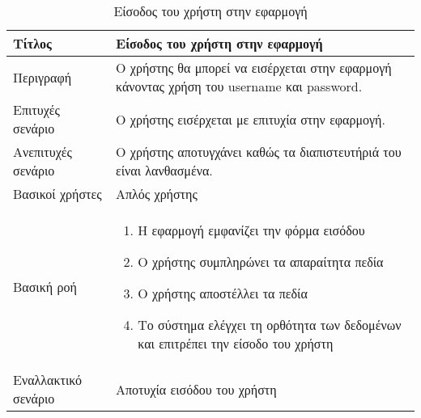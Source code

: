 
\begin{table}[h]
 \caption{Είσοδος του χρήστη στην εφαρμογή}
\begin{center}
\begin{tabular}{ | m{10em} |  m{25em} | } 
\hline
 Τίτλος & Είσοδος του χρήστη στην εφαρμογή \\ 
\hline
 Περιγραφή & Ο χρήστης θα μπορεί να εισέρχεται στην εφαρμογή κάνοντας χρήση του username και password. \\ 
\hline
 Επιτυχές σενάριο & Ο χρήστης εισέρχεται με επιτυχία στην εφαρμογή.\\
\hline
 Ανεπιτυχές σενάριο  & Ο χρήστης  αποτυγχάνει καθώς τα διαπιστευτήριά του είναι λανθασμένα. \\ 
\hline
 Βασικοί χρήστες  & Απλός χρήστης \\ 
\hline
 Βασική ροή  & 
\begin{enumerate}
\item Η εφαρμογή εμφανίζει την φόρμα εισόδου
\item Ο χρήστης συμπληρώνει τα απαραίτητα πεδία
\item Ο χρήστης αποστέλλει τα πεδία
\item Το σύστημα ελέγχει τη ορθότητα των δεδομένων και επιτρέπει την είσοδο του χρήστη
\end{enumerate}
 \\ 
\hline
 Εναλλακτικό σενάριο  & Αποτυχία εισόδου του χρήστη  \\ 
\hline
\end{tabular}
\end{center}
\end{table}


